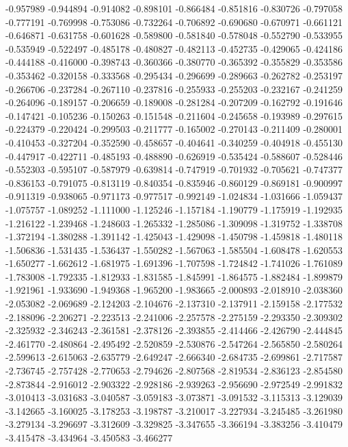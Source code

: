 -0.957989
-0.944894
-0.914082
-0.898101
-0.866484
-0.851816
-0.830726
-0.797058
-0.777191
-0.769998
-0.753086
-0.732264
-0.706892
-0.690680
-0.670971
-0.661121
-0.646871
-0.631758
-0.601628
-0.589800
-0.581840
-0.578048
-0.552790
-0.533955
-0.535949
-0.522497
-0.485178
-0.480827
-0.482113
-0.452735
-0.429065
-0.424186
-0.444188
-0.416000
-0.398743
-0.360366
-0.380770
-0.365392
-0.355829
-0.353586
-0.353462
-0.320158
-0.333568
-0.295434
-0.296699
-0.289663
-0.262782
-0.253197
-0.266706
-0.237284
-0.267110
-0.237816
-0.255933
-0.255203
-0.232167
-0.241259
-0.264096
-0.189157
-0.206659
-0.189008
-0.281284
-0.207209
-0.162792
-0.191646
-0.147421
-0.105236
-0.150263
-0.151548
-0.211604
-0.245658
-0.193989
-0.297615
-0.224379
-0.220424
-0.299503
-0.211777
-0.165002
-0.270143
-0.211409
-0.280001
-0.410453
-0.327204
-0.352590
-0.458657
-0.404641
-0.340259
-0.404918
-0.455130
-0.447917
-0.422711
-0.485193
-0.488890
-0.626919
-0.535424
-0.588607
-0.528446
-0.552303
-0.595107
-0.587979
-0.639814
-0.747919
-0.701932
-0.705621
-0.747377
-0.836153
-0.791075
-0.813119
-0.840354
-0.835946
-0.860129
-0.869181
-0.900997
-0.911319
-0.938065
-0.971173
-0.977517
-0.992149
-1.024834
-1.031666
-1.059437
-1.075757
-1.089252
-1.111000
-1.125246
-1.157184
-1.190779
-1.175919
-1.192935
-1.216122
-1.239468
-1.248603
-1.265332
-1.285086
-1.309098
-1.319752
-1.338708
-1.372194
-1.380288
-1.391142
-1.425043
-1.429098
-1.450798
-1.459818
-1.480118
-1.506836
-1.531435
-1.536437
-1.550282
-1.567063
-1.585504
-1.608478
-1.620553
-1.650277
-1.662612
-1.681975
-1.691396
-1.707598
-1.724842
-1.741026
-1.761089
-1.783008
-1.792335
-1.812933
-1.831585
-1.845991
-1.864575
-1.882484
-1.899879
-1.921961
-1.933690
-1.949368
-1.965200
-1.983665
-2.000893
-2.018910
-2.038360
-2.053082
-2.069689
-2.124203
-2.104676
-2.137310
-2.137911
-2.159158
-2.177532
-2.188096
-2.206271
-2.223513
-2.241006
-2.257578
-2.275159
-2.293350
-2.309302
-2.325932
-2.346243
-2.361581
-2.378126
-2.393855
-2.414466
-2.426790
-2.444845
-2.461770
-2.480864
-2.495492
-2.520859
-2.530876
-2.547264
-2.565850
-2.580264
-2.599613
-2.615063
-2.635779
-2.649247
-2.666340
-2.684735
-2.699861
-2.717587
-2.736745
-2.757428
-2.770653
-2.794626
-2.807568
-2.819534
-2.836123
-2.854580
-2.873844
-2.916012
-2.903322
-2.928186
-2.939263
-2.956690
-2.972549
-2.991832
-3.010413
-3.031683
-3.040587
-3.059183
-3.073871
-3.091532
-3.115313
-3.129039
-3.142665
-3.160025
-3.178253
-3.198787
-3.210017
-3.227934
-3.245485
-3.261980
-3.279134
-3.296697
-3.312609
-3.329825
-3.347655
-3.366194
-3.383256
-3.410479
-3.415478
-3.434964
-3.450583
-3.466277
